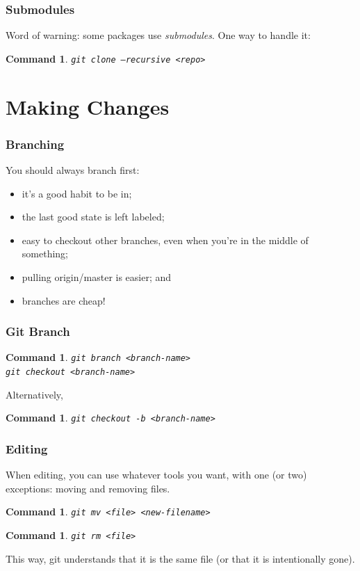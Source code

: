 \documentclass{beamer}
\newtheorem{command}[theorem]{Command}
\begin{document}
\begin{frame}
    \frametitle{Submodules}
    Word of warning: some packages use \emph{submodules}. One way to handle it:
    \begin{command}
        \texttt{git clone --recursive <repo>}
    \end{command}
\end{frame}

\section{Making Changes}

\begin{frame}
    \frametitle{Branching}
    You should always branch first:
    \pause
    \begin{itemize}
        \item it's a good habit to be in;
        \item the last good state is left labeled;
        \item easy to checkout other branches, even when you're in the middle of something;
        \item pulling origin/master is easier; and
        \item branches are cheap!
    \end{itemize}
\end{frame}

\begin{frame}
    \frametitle{Git Branch}
    \begin{command}
        \texttt{git branch <branch-name>}\\
        \texttt{git checkout <branch-name>}
    \end{command}
    Alternatively,
    \begin{command}
        \texttt{git checkout -b <branch-name>}
    \end{command}
\end{frame}


\begin{frame}
    \frametitle{Editing}
    When editing, you can use whatever tools you want, with one (or two) exceptions:
    \pause
    moving and removing files.
    \begin{command}
        \texttt{git mv <file> <new-filename>}
    \end{command}
    \begin{command}
        \texttt{git rm <file>}
    \end{command}
    This way, git understands that it is the same file (or that it is intentionally gone).
\end{frame}
\end{document}
